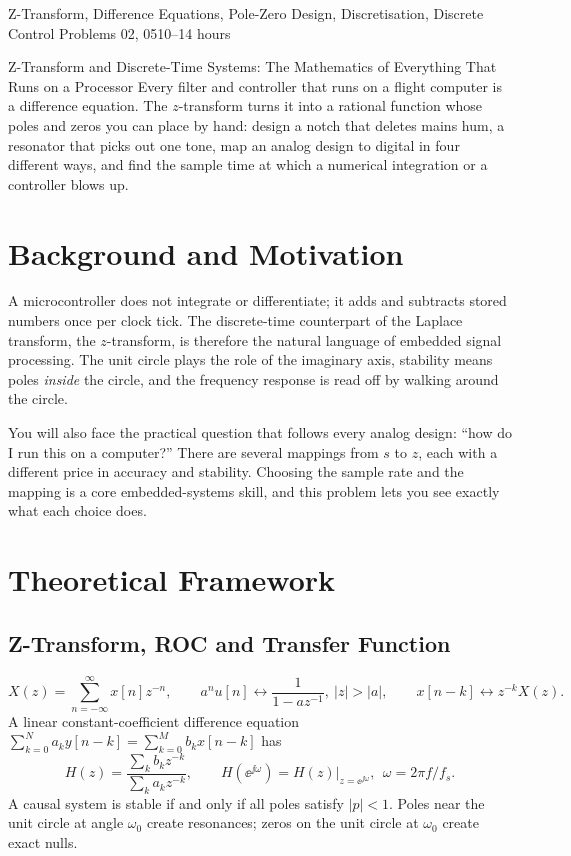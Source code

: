 \documentclass[11pt,a4paper]{article}
\begin{document}
%
{Z-Transform, Difference Equations, Pole-Zero Design, Discretisation, Discrete Control}%
{Problems 02, 05}{10--14 hours}

\begin{summarybox}{Z-Transform and Discrete-Time Systems: The Mathematics of Everything That Runs on a Processor}
Every filter and controller that runs on a flight computer is a difference equation. The $z$-transform turns it into a rational function whose poles and zeros you can place by hand: design a notch that deletes mains hum, a resonator that picks out one tone, map an analog design to digital in four different ways, and find the sample time at which a numerical integration or a controller blows up.
\end{summarybox}


\section*{Background and Motivation}
A microcontroller does not integrate or differentiate; it adds and subtracts stored numbers once per clock tick. The discrete-time counterpart of the Laplace transform, the $z$-transform, is therefore the natural language of embedded signal processing. The unit circle plays the role of the imaginary axis, stability means poles \emph{inside} the circle, and the frequency response is read off by walking around the circle.

You will also face the practical question that follows every analog design: ``how do I run this on a computer?'' There are several mappings from $s$ to $z$, each with a different price in accuracy and stability. Choosing the sample rate and the mapping is a core embedded-systems skill, and this problem lets you see exactly what each choice does.

\section*{Theoretical Framework}
\subsection{Z-Transform, ROC and Transfer Function}
\begin{equation}
  X(z)=\sum_{n=-\infty}^{\infty}x[n]z^{-n},\qquad
  a^nu[n]\leftrightarrow\frac{1}{1-az^{-1}},\ |z|>|a|,\qquad x[n-k]\leftrightarrow z^{-k}X(z).
  \label{eq:zt}
\end{equation}
A linear constant-coefficient difference equation $\sum_{k=0}^{N}a_ky[n-k]=\sum_{k=0}^{M}b_kx[n-k]$ has
\begin{equation}
  H(z)=\frac{\sum_kb_kz^{-k}}{\sum_ka_kz^{-k}},\qquad H(\ee^{\jj\omega})=H(z)\big|_{z=\ee^{\jj\omega}},\ \ \omega=2\pi f/f_s.
  \label{eq:Hz}
\end{equation}
A causal system is stable if and only if all poles satisfy $|p|<1$. Poles near the unit circle at angle $\omega_0$ create resonances; zeros on the unit circle at $\omega_0$ create exact nulls.
\end{document}
